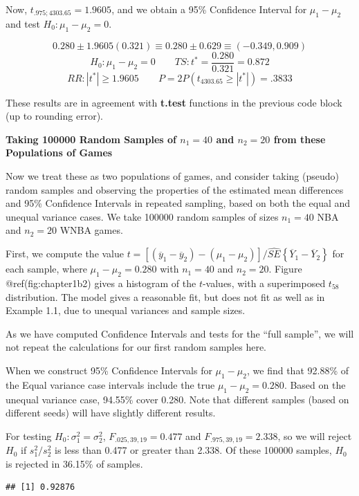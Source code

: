 \documentclass[
]{book}
\begin{document}
Now, \(t_{.975;4303.65}=1.9605\), and we obtain a 95\% Confidence
Interval for \(\mu_1-\mu_2\) and test \(H_0:\mu_1-\mu_2=0\).

\[
0.280 \pm 1.9605(0.321)\equiv 0.280\pm 0.629 \equiv (-0.349,0.909)
\] \[
H_0: \mu_1-\mu_2=0  \qquad  TS: t^*=\frac{0.280}{0.321}=0.872
\] \[
RR: |t^*| \geq 1.9605 \qquad P=2P\left(t_{4303.65}\geq |t^*|\right)=.3833
\]

These results are in agreement with \textbf{t.test} functions in the
previous code block (up to rounding error).

\textbf{Taking 100000 Random Samples of \(n_1=40\) and \(n_2=20\) from
these Populations of Games}

Now we treat these as two populations of games, and consider taking
(pseudo) random samples and observing the properties of the estimated
mean differences and 95\% Confidence Intervals in repeated sampling,
based on both the equal and unequal variance cases. We take 100000
random samples of sizes \(n_1=40\) NBA and \(n_2=20\) WNBA games.

First, we compute the value
\(t=\left[\left(\overline{y}_1-\overline{y}_2\right)-\left(\mu_1-\mu_2\right)\right]/\hat{SE}\left\{\overline{Y}_1-\overline{Y}_2\right\}\)
for each sample, where \(\mu_1-\mu_2=0.280\) with \(n_1=40\) and
\(n_2=20\). Figure @ref(fig:chapter1b2) gives a histogram of the
\(t\)-values, with a superimposed \(t_{58}\) distribution. The model
gives a reasonable fit, but does not fit as well as in Example 1.1, due
to unequal variances and sample sizes.

As we have computed Confidence Intervals and tests for the ``full
sample'', we will not repeat the calculations for our first random
samples here.

When we construct 95\% Confidence Intervals for \(\mu_1-\mu_2\), we find
that 92.88\% of the Equal variance case intervals include the true
\(\mu_1-\mu_2=0.280\). Based on the unequal variance case, 94.55\% cover
0.280. Note that different samples (based on different seeds) will have
slightly different results.

For testing \(H_0:\sigma_1^2=\sigma_2^2\), \(F_{.025,39,19}=0.477\) and
\(F_{.975,39,19}=2.338\), so we will reject \(H_0\) if \(s_1^2/s_2^2\)
is less than 0.477 or greater than 2.338. Of these 100000 samples,
\(H_0\) is rejected in 36.15\% of samples.

\begin{verbatim}
## [1] 0.92876
\end{verbatim}
\end{document}
